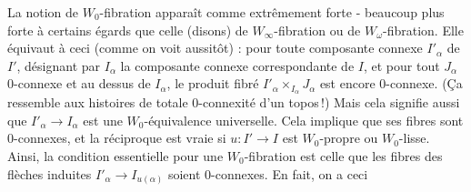 La notion de $W_0$-fibration apparaît comme extrêmement forte - beaucoup plus forte à certains égards que celle (disons) de $W_\infty$-fibration ou de $W_\omega$-fibration. Elle équivaut à ceci (comme on voit aussitôt) : pour toute composante connexe $I'_\alpha$ de $I'$, désignant par $I_\alpha$ la composante connexe correspondante de $I$, et pour tout $J_\alpha$ 0-connexe et au dessus de $I_\alpha$, le produit fibré $I'_\alpha \times_{I_\alpha} J_\alpha$ est encore 0-connexe. (Ça ressemble aux histoires de totale 0-connexité d'un topos\,!) Mais cela signifie aussi que $I'_\alpha \longrightarrow I_\alpha$ est une $W_0$-équivalence universelle. Cela implique que ses fibres sont 0-connexes, et la réciproque est vraie si $u : I' \longrightarrow I$ est $W_0$-propre ou $W_0$-lisse. Ainsi, la condition essentielle pour une $W_0$-fibration est celle que les fibres des flèches induites $I'_\alpha \longrightarrow I_{u(\alpha)}$ soient 0-connexes. En fait, on a ceci


